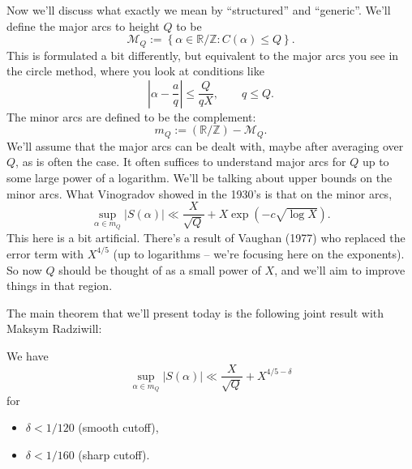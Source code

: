 \documentclass[reqno]{amsart} 
\begin{document}
Now we'll discuss what exactly we mean by ``structured'' and ``generic''.  We'll define the major arcs to height $Q$ to be
\begin{equation*}
  \mathcal{M}_Q := \left\{ \alpha \in \mathbb{R} / \mathbb{Z} : C(\alpha) \leq Q \right\}.
\end{equation*}
This is formulated a bit differently, but equivalent to the major arcs you see in the circle method, where you look at conditions like
\begin{equation*}
  \left| \alpha - \frac{a}{q} \right|
  \leq \frac{Q}{q X}, \qquad q \leq Q.
\end{equation*}
The minor arcs are defined to be the complement:
\begin{equation*}
  m_Q :=(\mathbb{R} / \mathbb{Z}) - \mathcal{M}_Q.
\end{equation*}
We'll assume that the major arcs can be dealt with, maybe after averaging over $Q$, as is often the case.  It often suffices to understand major arcs for $Q$ up to some large power of a logarithm.  We'll be talking about upper bounds on the minor arcs.  What Vinogradov showed in the 1930's is that on the minor arcs,
\begin{equation*}
  \sup_{\alpha \in m_Q} \lvert S(\alpha) \rvert \ll \frac{X}{\sqrt{Q}}
  + X \exp \left( - c \sqrt{\log X} \right).
\end{equation*}
This here is a bit artificial.  There's a result of Vaughan (1977) who replaced the error term with $X^{4/5}$ (up to logarithms -- we're focusing here on the exponents).  So now $Q$ should be thought of as a small power of $X$, and we'll aim to improve things in that region.

The main theorem that we'll present today is the following joint result with Maksym Radziwill:
\begin{theorem}[P., Radziwill, 2024]
  We have
  \begin{equation*}
    \sup_{\alpha \in m_Q}
    \left| S(\alpha) \right|
    \ll \frac{X}{ \sqrt{Q}}
    + X^{4/5 - \delta}
  \end{equation*}
  for
  \begin{itemize}
  \item $\delta < 1/120$ (smooth cutoff),
  \item $\delta < 1/160$ (sharp cutoff).
  \end{itemize}
\end{theorem}
\end{document}
